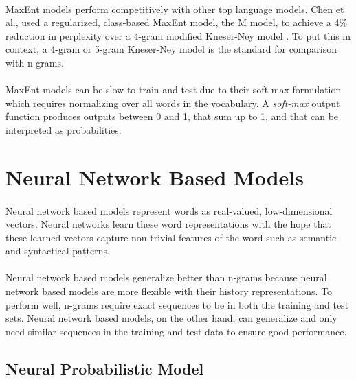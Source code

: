 \paragraph{}
MaxEnt models perform competitively with other top language models. Chen et al., used a regularized, class-based MaxEnt model, the M model, to achieve a 4\% reduction in perplexity over a 4-gram modified Kneser-Ney model \cite{Chen2009}. To put this in context, a 4-gram or 5-gram Kneser-Ney model is the standard for comparison with n-grams.
\paragraph{}

MaxEnt models can be slow to train and test due to their soft-max formulation which requires normalizing over all words in the vocabulary. A \emph{soft-max} output function produces outputs between 0 and 1, that sum up to 1, and that can be interpreted as probabilities. 

\section{Neural Network Based Models} \label{sec:nplm}
\paragraph{}
Neural network based models represent words as real-valued, low-dimensional vectors. Neural networks learn these word representations with the hope that these learned vectors capture non-trivial features of the word such as semantic and syntactical patterns.
\paragraph{}
Neural network based models generalize better than n-grams because neural network based models are more flexible with their history representations. To perform well, n-grams require exact sequences to be in both the training and test sets. Neural network based models, on the other hand, can generalize and only need similar sequences in the training and test data to ensure good performance.

\subsection{Neural Probabilistic Model}
